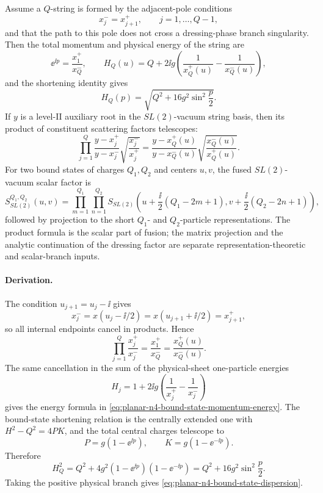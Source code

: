 \begin{construction}
\label{constr:planar-n4-bound-state-fusion}
Assume a \(Q\)-string is formed by the adjacent-pole conditions
\[
  x_j^-=x_{j+1}^+,\qquad j=1,\ldots,Q-1,
\]
and that the path to this pole does not cross a dressing-phase branch
singularity.  Then the total momentum and physical energy of the string are
\begin{equation}
  \ee^{\ii p}=\frac{x_1^+}{x_Q^-},
  \qquad
  H_Q(u)=Q+2\ii g\left(\frac1{x_Q^+(u)}-\frac1{x_Q^-(u)}\right),
  \label{eq:planar-n4-bound-state-momentum-energy}
\end{equation}
and the shortening identity gives
\begin{equation}
  H_Q(p)=\sqrt{Q^2+16g^2\sin^2\frac p2}.
  \label{eq:planar-n4-bound-state-dispersion}
\end{equation}
If \(y\) is a level-II auxiliary root in the \(SL(2)\)-vacuum string basis,
then its product of constituent scattering factors telescopes:
\begin{equation}
  \prod_{j=1}^{Q}
  \frac{y-x_j^+}{y-x_j^-}
  \sqrt{\frac{x_j^-}{x_j^+}}
  =
  \frac{y-x_Q^+(u)}{y-x_Q^-(u)}
  \sqrt{\frac{x_Q^-(u)}{x_Q^+(u)}} .
  \label{eq:planar-n4-bound-state-auxiliary-telescope}
\end{equation}
For two bound states of charges \(Q_1,Q_2\) and centers \(u,v\), the fused
\(SL(2)\)-vacuum scalar factor is
\begin{equation}
  S^{Q_1,Q_2}_{SL(2)}(u,v)
  =
  \prod_{m=1}^{Q_1}\prod_{n=1}^{Q_2}
  S_{SL(2)}
  \!\left(
    u+\frac{\ii}{2}(Q_1-2m+1),
    v+\frac{\ii}{2}(Q_2-2n+1)
  \right),
  \label{eq:planar-n4-fused-sl2-bound-state-scalar}
\end{equation}
followed by projection to the short \(Q_1\)- and \(Q_2\)-particle
representations.  The product formula is the scalar part of fusion; the
matrix projection and the analytic continuation of the dressing factor are
separate representation-theoretic and scalar-branch inputs.
\end{construction}

\paragraph{Derivation.}
The condition \(u_{j+1}=u_j-\ii\) gives
\[
  x_j^-=x(u_j-\ii/2)=x(u_{j+1}+\ii/2)=x_{j+1}^+,
\]
so all internal endpoints cancel in products.  Hence
\[
  \prod_{j=1}^{Q}\frac{x_j^+}{x_j^-}
  =
  \frac{x_1^+}{x_Q^-}
  =
  \frac{x_Q^+(u)}{x_Q^-(u)}.
\]
The same cancellation in the sum of the physical-sheet one-particle energies
\[
  H_j=1+2\ii g\left(\frac1{x_j^+}-\frac1{x_j^-}\right)
\]
gives the energy formula in
\eqref{eq:planar-n4-bound-state-momentum-energy}.  The bound-state
shortening relation is the centrally extended one with \(H^2-Q^2=4PK\), and
the total central charges telescope to
\[
  P=g(1-\ee^{\ii p}),
  \qquad
  K=g(1-\ee^{-\ii p}).
\]
Therefore
\[
  H_Q^2=Q^2+4g^2(1-\ee^{\ii p})(1-\ee^{-\ii p})
  =
  Q^2+16g^2\sin^2\frac p2 .
\]
Taking the positive physical branch gives
\eqref{eq:planar-n4-bound-state-dispersion}.

